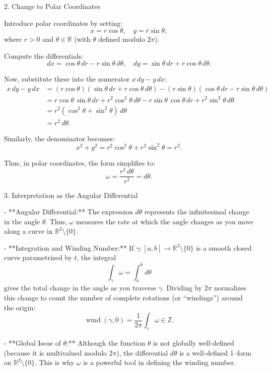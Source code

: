 \documentclass[11pt,openany]{article}
\begin{document}
 2. Change to Polar Coordinates

Introduce polar coordinates by setting:
\[
x = r\cos\theta,\quad y = r\sin\theta,
\]
where \(r>0\) and \(\theta \in \mathbb{R}\) (with \(\theta\) defined modulo \(2\pi\)).

Compute the differentials:
\[
dx = \cos\theta\,dr - r\sin\theta\,d\theta,\quad dy = \sin\theta\,dr + r\cos\theta\,d\theta.
\]

Now, substitute these into the numerator \(x\,dy - y\,dx\):
\[
\begin{aligned}
	x\,dy - y\,dx 
	&= (r\cos\theta)(\sin\theta\,dr + r\cos\theta\,d\theta) - (r\sin\theta)(\cos\theta\,dr - r\sin\theta\,d\theta) \\
	&= r\cos\theta\,\sin\theta\,dr + r^2\cos^2\theta\,d\theta - r\sin\theta\,\cos\theta\,dr + r^2\sin^2\theta\,d\theta \\
	&= r^2(\cos^2\theta + \sin^2\theta)\,d\theta \\
	&= r^2\,d\theta.
\end{aligned}
\]

Similarly, the denominator becomes:
\[
x^2+y^2 = r^2\cos^2\theta + r^2\sin^2\theta = r^2.
\]

Thus, in polar coordinates, the form simplifies to:
\[
\omega = \frac{r^2\,d\theta}{r^2} = d\theta.
\]

 3. Interpretation as the Angular Differential

- **Angular Differential:**  
The expression \(d\theta\) represents the infinitesimal change in the angle \(\theta\). Thus, \(\omega\) measures the rate at which the angle changes as you move along a curve in \(\mathbb{R}^2 \setminus \{0\}\).

- **Integration and Winding Number:**  
If \(\gamma: [a,b] \to \mathbb{R}^2 \setminus \{0\}\) is a smooth closed curve parametrized by \(t\), the integral
\[
\int_\gamma \omega = \int_a^b d\theta
\]
gives the total change in the angle as you traverse \(\gamma\). Dividing by \(2\pi\) normalizes this change to count the number of complete rotations (or “windings”) around the origin:
\[
\operatorname{wind}(\gamma,0) = \frac{1}{2\pi}\int_\gamma \omega \in \mathbb{Z}.
\]

- **Global Issue of \(\theta\):**  
Although the function \(\theta\) is not globally well-defined (because it is multivalued modulo \(2\pi\)), the differential \(d\theta\) is a well-defined 1–form on \(\mathbb{R}^2 \setminus \{0\}\). This is why \(\omega\) is a powerful tool in defining the winding number.
\end{document}

